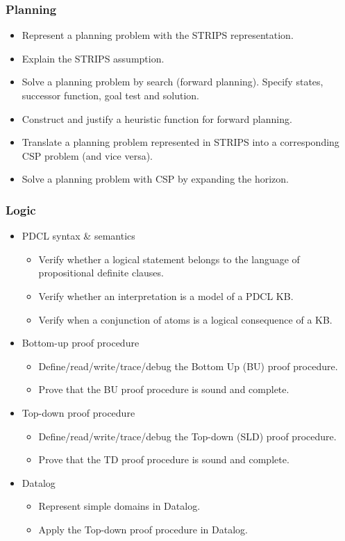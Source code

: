 \documentclass{article}
\begin{document}
\subsubsection*{Planning}

\begin{itemize}
    \item Represent a planning problem with the STRIPS representation.
    \item Explain the STRIPS assumption.
    \item Solve a planning problem by search (forward planning). Specify states, successor function, goal test and solution.
    \item Construct and justify a heuristic function for forward planning.
    \item Translate a planning problem represented in STRIPS into a corresponding CSP problem (and vice versa).
    \item Solve a planning problem with CSP by expanding the horizon.
\end{itemize}

\subsubsection*{Logic}

\begin{itemize}
    \item PDCL syntax \& semantics
        \begin{itemize}
            \item Verify whether a logical statement belongs to the language of propositional definite clauses.
            \item Verify whether an interpretation is a model of a PDCL KB.
            \item Verify when a conjunction of atoms is a logical consequence of a KB.
        \end{itemize}
    \item Bottom-up proof procedure
        \begin{itemize}
            \item Define/read/write/trace/debug the Bottom Up (BU) proof procedure.
            \item Prove that the BU proof procedure is sound and complete.
        \end{itemize}
    \item Top-down proof procedure
        \begin{itemize}
            \item Define/read/write/trace/debug the Top-down (SLD) proof procedure.
            \item Prove that the TD proof procedure is sound and complete.
        \end{itemize}
    \item Datalog
        \begin{itemize}
            \item Represent simple domains in Datalog.
            \item Apply the Top-down proof procedure in Datalog.
        \end{itemize}
\end{itemize}
\end{document}
